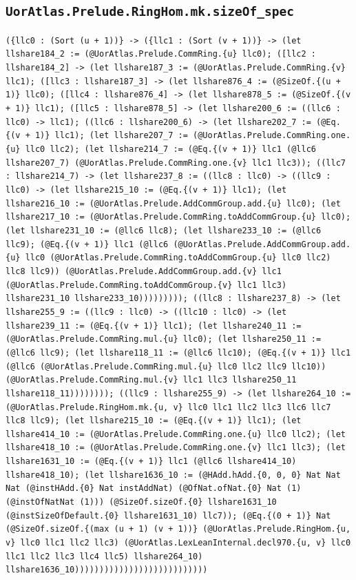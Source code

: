 \documentclass[11pt]{article}
\begin{document}
\subsection*{\texttt{UorAtlas.Prelude.RingHom.mk.sizeOf\_spec}}
\noindent\texttt{(\{llc0 : (Sort (u + 1))\} -> (\{llc1 : (Sort (v + 1))\} -> (let llshare184\_2 := (@UorAtlas.Prelude.CommRing.\{u\} llc0); ([llc2 : llshare184\_2] -> (let llshare187\_3 := (@UorAtlas.Prelude.CommRing.\{v\} llc1); ([llc3 : llshare187\_3] -> (let llshare876\_4 := (@SizeOf.\{(u + 1)\} llc0); ([llc4 : llshare876\_4] -> (let llshare878\_5 := (@SizeOf.\{(v + 1)\} llc1); ([llc5 : llshare878\_5] -> (let llshare200\_6 := ((llc6 : llc0) -> llc1); ((llc6 : llshare200\_6) -> (let llshare202\_7 := (@Eq.\{(v + 1)\} llc1); (let llshare207\_7 := (@UorAtlas.Prelude.CommRing.one.\{u\} llc0 llc2); (let llshare214\_7 := (@Eq.\{(v + 1)\} llc1 (@llc6 llshare207\_7) (@UorAtlas.Prelude.CommRing.one.\{v\} llc1 llc3)); ((llc7 : llshare214\_7) -> (let llshare237\_8 := ((llc8 : llc0) -> ((llc9 : llc0) -> (let llshare215\_10 := (@Eq.\{(v + 1)\} llc1); (let llshare216\_10 := (@UorAtlas.Prelude.AddCommGroup.add.\{u\} llc0); (let llshare217\_10 := (@UorAtlas.Prelude.CommRing.toAddCommGroup.\{u\} llc0); (let llshare231\_10 := (@llc6 llc8); (let llshare233\_10 := (@llc6 llc9); (@Eq.\{(v + 1)\} llc1 (@llc6 (@UorAtlas.Prelude.AddCommGroup.add.\{u\} llc0 (@UorAtlas.Prelude.CommRing.toAddCommGroup.\{u\} llc0 llc2) llc8 llc9)) (@UorAtlas.Prelude.AddCommGroup.add.\{v\} llc1 (@UorAtlas.Prelude.CommRing.toAddCommGroup.\{v\} llc1 llc3) llshare231\_10 llshare233\_10))))))))); ((llc8 : llshare237\_8) -> (let llshare255\_9 := ((llc9 : llc0) -> ((llc10 : llc0) -> (let llshare239\_11 := (@Eq.\{(v + 1)\} llc1); (let llshare240\_11 := (@UorAtlas.Prelude.CommRing.mul.\{u\} llc0); (let llshare250\_11 := (@llc6 llc9); (let llshare118\_11 := (@llc6 llc10); (@Eq.\{(v + 1)\} llc1 (@llc6 (@UorAtlas.Prelude.CommRing.mul.\{u\} llc0 llc2 llc9 llc10)) (@UorAtlas.Prelude.CommRing.mul.\{v\} llc1 llc3 llshare250\_11 llshare118\_11)))))))); ((llc9 : llshare255\_9) -> (let llshare264\_10 := (@UorAtlas.Prelude.RingHom.mk.\{u, v\} llc0 llc1 llc2 llc3 llc6 llc7 llc8 llc9); (let llshare215\_10 := (@Eq.\{(v + 1)\} llc1); (let llshare414\_10 := (@UorAtlas.Prelude.CommRing.one.\{u\} llc0 llc2); (let llshare418\_10 := (@UorAtlas.Prelude.CommRing.one.\{v\} llc1 llc3); (let llshare1631\_10 := (@Eq.\{(v + 1)\} llc1 (@llc6 llshare414\_10) llshare418\_10); (let llshare1636\_10 := (@HAdd.hAdd.\{0, 0, 0\} Nat Nat Nat (@instHAdd.\{0\} Nat instAddNat) (@OfNat.ofNat.\{0\} Nat (1) (@instOfNatNat (1))) (@SizeOf.sizeOf.\{0\} llshare1631\_10 (@instSizeOfDefault.\{0\} llshare1631\_10) llc7)); (@Eq.\{(0 + 1)\} Nat (@SizeOf.sizeOf.\{(max (u + 1) (v + 1))\} (@UorAtlas.Prelude.RingHom.\{u, v\} llc0 llc1 llc2 llc3) (@UorAtlas.LexLeanInternal.decl970.\{u, v\} llc0 llc1 llc2 llc3 llc4 llc5) llshare264\_10) llshare1636\_10)))))))))))))))))))))))))))}\par
\end{document}
